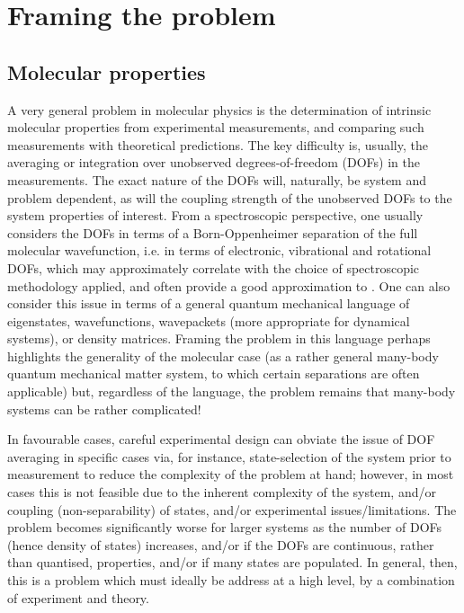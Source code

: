 \section{Framing the problem}

\subsection{Molecular properties}
A very general problem in molecular physics is the determination of intrinsic molecular properties from experimental measurements, and comparing such measurements with theoretical predictions. The key difficulty is, usually, the averaging or integration over unobserved degrees-of-freedom (DOFs) in the measurements. The exact nature of the DOFs will, naturally, be system and problem dependent, as will the coupling strength of the unobserved DOFs to the system properties of interest. From a spectroscopic perspective, one usually considers the DOFs in terms of a Born-Oppenheimer separation of the full molecular wavefunction, i.e. in terms of electronic, vibrational and rotational DOFs, which may approximately correlate with the choice of spectroscopic methodology applied, and often provide a good approximation to . One can also consider this issue in terms of a general quantum mechanical language of eigenstates, wavefunctions, wavepackets (more appropriate for dynamical systems), or density matrices. Framing the problem in this language perhaps highlights the generality of the molecular case (as a rather general many-body quantum mechanical matter system, to which certain separations are often applicable) but, regardless of the language, the problem remains that many-body systems can be rather complicated!

In favourable cases, careful experimental design can obviate the issue of DOF averaging in specific cases via, for instance, state-selection of the system prior to measurement to reduce the complexity of the problem at hand; however, in most cases this is not feasible due to the inherent complexity of the system, and/or coupling (non-separability) of states, and/or experimental issues/limitations. The problem becomes significantly worse for larger systems as the number of DOFs (hence density of states) increases, and/or if the DOFs are continuous, rather than quantised, properties, and/or if many states are populated. In general, then, this is a problem which must ideally be address at a high level, by a combination of experiment and theory.